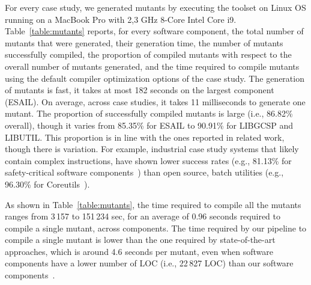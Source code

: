 {For every case study, we generated mutants by executing the \APPR toolset on Linux OS running on a MacBook Pro with 2,3 GHz 8-Core Intel Core i9. 
Table~\ref{table:mutants} reports, for every software component, the total number of mutants that were generated, their generation time, the number of mutants successfully compiled, the proportion of compiled mutants with respect to the overall number of mutants generated, and the time required to compile mutants using the default compiler optimization options of the case study.
The generation of mutants is fast, it takes at most 182 seconds on the largest component (ESAIL). On average, across case studies, it takes 11 milliseconds to generate one mutant. 
The proportion of successfully compiled mutants is large (i.e., 86.82\% overall), though it varies from 85.35\% for ESAIL to 90.91\% for LIBGCSP and LIBUTIL.
This proportion is in line with the ones reported in related work, though there is variation. For example, industrial case study systems that likely contain complex instructions, have shown lower success rates (e.g., 81.13\% for safety-critical software components~\cite{Baker2013}) than open source, batch utilities (e.g., 96.30\% for Coreutils~\cite{hariri2016evaluating}).} 
 
{As shown in Table~\ref{table:mutants}, the time required to compile all the mutants ranges from 3\,157 to 151\,234 sec, for an average of 0.96 seconds required to compile a single mutant, across components. The time required by our pipeline to compile a single mutant is lower than the one required by state-of-the-art approaches, which is around 4.6 seconds per mutant, even when software components have a lower number of LOC (i.e., 22\,827 LOC)  than our software components~\cite{kintis2017detecting}.
}

 



